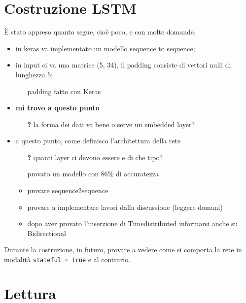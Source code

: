 \documentclass[twoside,twocolumn]{article}
\theoremstyle{definition}
\begin{document}
\section{Costruzione LSTM}
	È stato appreso quanto segue, cioè poco, e con molte domande.
	\begin{itemize}
		\item in keras va implementato un modello sequence to sequence;
		\item in input ci va una matrice (5, 34), il padding consiste di vettori nulli di lunghezza 5;
		\begin{itemize}
			\item[\textbf{\checkmark}] padding fatto con Keras
		\end{itemize}
		\item \textbf{mi trovo a questo punto}
		\begin{itemize}
			\item[\textbf{?}] la forma dei dati va bene o serve un embedded layer?
		\end{itemize}
		\item a questo punto, come definisco l'architettura della rete
		\begin{itemize}
			\item[\textbf{?}] quanti layer ci devono essere e di che tipo?
			\item[\checkmark] provato un modello con 86\% di accuratezza
			\item provare sequence2sequence
			\item provare a implementare lavori dalla discussione (leggere domani)
			\item dopo aver provato l'inserzione di Timedistributed informarsi anche su Bidirectional
		\end{itemize}
	\end{itemize}
	Durante la costruzione, in futuro, provare a vedere come si comporta la rete in modalità \texttt{stateful = True} e al contrario.

\section{Lettura \cite{bib:fenomeni-prosodici-prominenza}}
\end{document}
